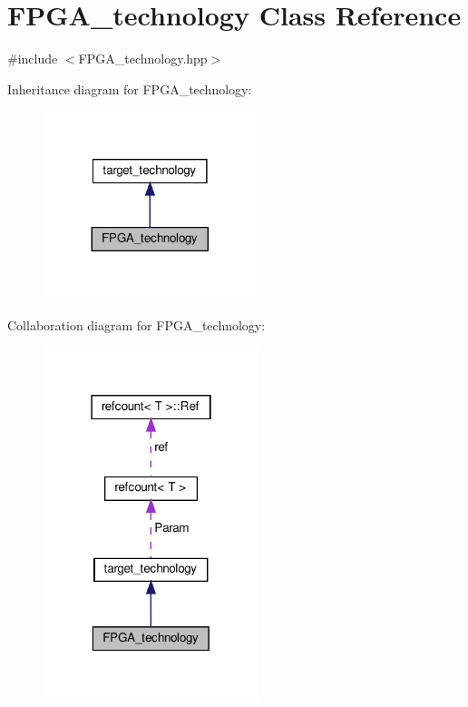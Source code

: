 \hypertarget{classFPGA__technology}{}\section{F\+P\+G\+A\+\_\+technology Class Reference}
\label{classFPGA__technology}


{\ttfamily \#include $<$F\+P\+G\+A\+\_\+technology.\+hpp$>$}



Inheritance diagram for F\+P\+G\+A\+\_\+technology\+:
\nopagebreak
\begin{figure}[H]
\begin{center}
\leavevmode
\includegraphics[width=176pt]{d5/d08/classFPGA__technology__inherit__graph}
\end{center}
\end{figure}


Collaboration diagram for F\+P\+G\+A\+\_\+technology\+:
\nopagebreak
\begin{figure}[H]
\begin{center}
\leavevmode
\includegraphics[width=178pt]{dc/d9e/classFPGA__technology__coll__graph}
\end{center}
\end{figure}
